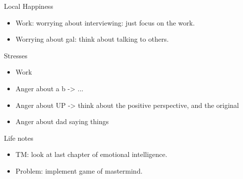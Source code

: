 \begin{frame}
  \begin{columns}
    \begin{column}{0.25\linewidth} %
      \begin{block}{Local Happiness}
        \begin{itemize}
          \tiny \item \tiny Work: worrying about interviewing: just focus on the work. 
        \item \tiny Worrying about gal: think about talking to others. 
        \end{itemize}
      \end{block}
      \begin{block}{Stresses}
        \begin{itemize}
          \tiny \item \tiny Work 
          \item \tiny Anger about a b  -> ...
          \item \tiny Anger about UP -> think about the positive
            perspective, and the original
          \item \tiny Anger about dad saying things 
        \end{itemize}
      \end{block} 
      \begin{block}{Life notes}
        \begin{itemize}
        \item \tiny TM: look at last chapter of emotional
          intelligence.  
        \item \tiny Problem: implement game of mastermind. 
        \end{itemize}
      \end{block}
    \end{column} %


\end{columns}
\end{frame}

